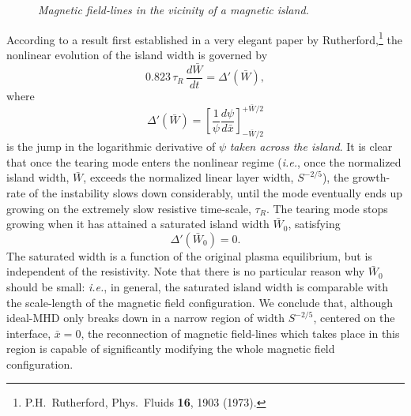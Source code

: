\begin{figure}
\epsfysize=3in
\centerline{}
\caption{\em Magnetic field-lines in the vicinity of a magnetic island.}\label{f27}
\end{figure}

According to a result first established in a very elegant paper by 
Rutherford,\footnote{P.H.~Rutherford, Phys.\ Fluids {\bf 16}, 1903 (1973).}
the nonlinear evolution of the island width is governed by
\begin{equation}
0.823\,\tau_R\,\frac{d\bar{W}}{dt} = {\Delta}'(\bar{W}),
\end{equation}
where
\begin{equation}
{\Delta}'(\bar{W}) =
 \left[\frac{1}{\psi}\frac{d\psi}{d\bar{x}}\right]_{-\bar{W}/2}^{+\bar{W}/2}
\end{equation}
is the jump in the logarithmic derivative of $\psi$ {\em taken across the island}.
It is clear that once the tearing mode enters the nonlinear regime ({\em i.e.},
once the normalized island width, $\bar{W}$, exceeds the normalized linear layer width, $S^{-2/5}$), 
the growth-rate of the instability slows down considerably, until the mode
eventually ends up growing on the extremely slow resistive time-scale, $\tau_R$. 
The tearing mode stops growing when it has attained a saturated island width
$\bar{W}_0$, satisfying
\begin{equation}
{\Delta}'(\bar{W}_0) = 0.
\end{equation}
The saturated width is a function of the original 
plasma equilibrium, but is independent
of the resistivity. Note that there is no particular reason why $\bar{W}_0$ should
be small: {\em i.e.}, in general, the saturated island width is comparable
with the scale-length of the  magnetic field configuration.
We conclude that, although ideal-MHD only breaks down in a narrow region of
width $S^{-2/5}$, centered on the interface, $\bar{x}=0$, the reconnection of
magnetic field-lines which takes place
in this region is capable of significantly
modifying the whole magnetic field configuration. 

